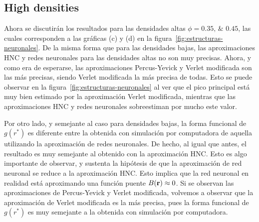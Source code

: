 \subsection{High densities}
Ahora se discutirán los resultados para las densidades altas $\phi=\numlist{0.35; 0.45}$,
las cuales corresponden a las gráficas (c) y (d) en la figura~\ref{fig:estructuras-neuronales}.
De la misma forma que para las densidades bajas, las aproximaciones HNC y redes neuronales
para las densidades altas no son muy precisas. Ahora, y como era de esperarse, las 
aproximaciones Percus-Yevick y Verlet modificada son las más precisas, siendo Verlet
modificada la más precisa de todas. Esto se puede observar en la figura~\ref{fig:estructuras-neuronales}
al ver que el pico principal está muy bien estimado por la aproximación Verlet modificada,
mientras que las aproximaciones HNC y redes neuronales sobreestiman por mucho este valor.

Por otro lado, y semejante al caso para densidades bajas, la forma funcional de $g(r^*)$
es diferente entre la obtenida con simulación por computadora de aquella utilizando la
aproximación de redes neuronales. De hecho, al igual que antes, el resultado es muy
semejante al obtenido con la aproximación HNC. Esto es algo importante de observar, y
sustenta la hipótesis de que la aproximación de red neuronal se reduce a la aproximación
HNC.
Esto implica que la red neuronal en realidad está aproximando una función puente
$B(\mathbf{r}) \approx 0$.
Si se observan las aproximaciones de Percus-Yevick y Verlet modificada, volvemos a observar
que la aproximación de Verlet modificada es la más precisa, pues la forma funcional de
$g(r^*)$ es muy semejante a la obtenida con simulación por computadora.
